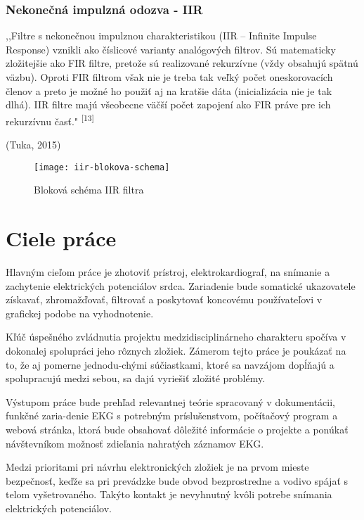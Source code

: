 \documentclass[titlepage,12pt]{article}
\begin{document}
\subsubsection*{Nekonečná impulzná odozva - IIR}
,,Filtre s nekonečnou impulznou charakteristikou (IIR – Infinite Impulse Response) vznikli ako číslicové varianty analógových filtrov. Sú matematicky zložitejšie ako FIR filtre, pretože  sú  realizované rekurzívne  (vždy  obsahujú  spätnú  väzbu).  Oproti  FIR filtrom však nie je treba tak veľký počet oneskorovacích členov a preto je možné ho použiť aj na kratšie dáta (inicializácia nie je tak dlhá). IIR filtre majú všeobecne väčší počet zapojení ako FIR práve pre ich rekurzívnu časť." \textsuperscript{[13]}
\begin{flushright}
(Tuka, 2015)
\end{flushright}
\begin{figure}[!ht]
\begin{center}
\texttt{[image: iir-blokova-schema]}
\caption{Bloková schéma IIR filtra}
\end{center}
\end{figure}


\newpage
\section{Ciele práce}
Hlavným cieľom práce je zhotoviť prístroj, elektrokardiograf, na snímanie a zachytenie elektrických potenciálov srdca. Zariadenie bude somatické ukazovatele získavať, zhromažďovať, filtrovať a poskytovať koncovému používateľovi v grafickej podobe na vyhodnotenie.

Kľúč úspešného zvládnutia projektu medzidisciplinárneho charakteru spočíva v dokonalej spolupráci jeho rôznych zložiek. Zámerom tejto práce je poukázať na to, že aj pomerne jednodu-chými súčiastkami, ktoré sa navzájom dopĺňajú a spolupracujú medzi sebou, sa dajú vyriešiť zložité problémy.

Výstupom práce bude prehľad relevantnej teórie spracovaný v dokumentácii, 
funkčné zaria-denie EKG s potrebným príslušenstvom, počítačový program a webová stránka, ktorá bude obsahovať dôležité informácie o projekte a ponúkať návštevníkom možnosť zdieľania nahratých záznamov EKG.

Medzi prioritami pri návrhu elektronických zložiek je na prvom mieste bezpečnosť, keďže sa pri prevádzke bude obvod bezprostredne a vodivo spájať s telom vyšetrovaného. Takýto kontakt je nevyhnutný kvôli potrebe snímania elektrických potenciálov.
\end{document}
